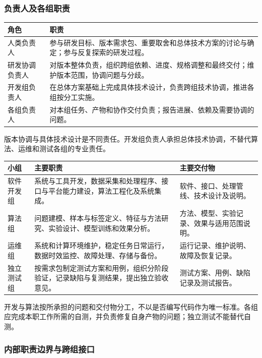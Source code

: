 \documentclass[11pt,a4paper]{article}
\begin{document}
\subsubsection{负责人及各组职责}

\begin{longtable}{L{35mm}L{119mm}}
\toprule
角色 & 职责\\\midrule\endhead
人类负责人 & 参与研发目标、版本需求包、重要取舍和总体技术方案的讨论与确定；参与反复探索的研发过程。\\
研发协调负责人 & 对版本整体负责，组织跨组依赖、进度、规格调整和最终交付；维护版本范围，协调问题与分歧。\\
开发组负责人 & 在总体方案基础上完成具体技术设计，负责跨组技术协调，推进各组按分工实施。\\
各组负责人 & 对本组任务、产物和协作交付负责；报告进展、依赖及需要协调的问题。\\\bottomrule
\end{longtable}

版本协调与具体技术设计是不同责任。开发组负责人承担总体技术协调，不替代算法、运维和测试各组的专业责任。

\begin{longtable}{L{27mm}L{80mm}L{45mm}}
\toprule
小组 & 主要职责 & 主要交付物\\\midrule\endhead
软件开发组 & 系统与工具开发，数据采集和处理程序、接口与平台能力建设，算法工程化及系统集成。 & 软件、接口、处理管线、技术设计及说明。\\
算法组 & 问题建模、样本与标签定义、特征与方法研究、实验设计、模型训练和效果分析。 & 方法、模型、实验记录、效果与适用范围说明。\\
运维组 & 系统和计算环境维护，稳定任务日常运行，数据时效监控、故障处理、存储与备份。 & 运行记录、维护说明、故障及恢复记录。\\
独立测试组 & 按需求包制定测试方案和用例，组织分阶段验证，记录缺陷与复测结果，提出独立验收意见。 & 测试方案、用例、缺陷记录及测试报告。\\\bottomrule
\end{longtable}

开发与算法按所承担的问题和交付物分工，不以是否编写代码作为唯一标准。各组应完成本职工作所需的自测，并负责修复自身产物的问题；独立测试不能替代自测。


\subsubsection{内部职责边界与跨组接口}
\end{document}
